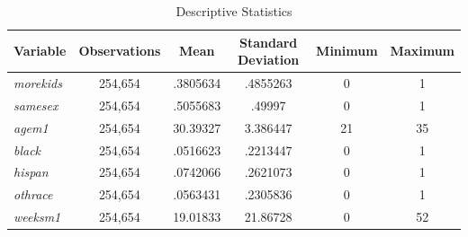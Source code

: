 \documentclass{article}
\begin{document}
\begin{center}
\begin{table}[hb!]
\centering
\caption{Descriptive Statistics}
\begin{tabular}{|l|c|c|c|c|c|}
\hline
\multicolumn{1}{|c|}{\textbf{Variable}} & \textbf{Observations} & \textbf{Mean} & \textbf{Standard Deviation} & \textbf{Minimum} & \textbf{Maximum} \\ \hline
\textit{morekids}                       & 254,654               & .3805634      & .4855263                    & 0                & 1                \\ \hline
\textit{samesex}                        & 254,654               & .5055683      & .49997                      & 0                & 1                \\ \hline
\textit{agem1}                          & 254,654               & 30.39327      & 3.386447                    & 21               & 35               \\ \hline
\textit{black}                          & 254,654               & .0516623      & .2213447                    & 0                & 1                \\ \hline
\textit{hispan}                         & 254,654               & .0742066      & .2621073                    & 0                & 1                \\ \hline
\textit{othrace}                        & 254,654               & .0563431      & .2305836                    & 0                & 1                \\ \hline
\textit{weeksm1}                        & 254,654               & 19.01833      & 21.86728                    & 0                & 52               \\ \hline
\end{tabular}
\end{table}
\end{center}
\end{document}
